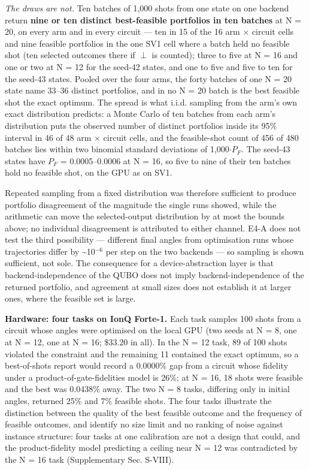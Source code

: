 \documentclass{ieeeaccess}
\begin{document}
\textit{The draws are not.} Ten batches of 1,000 shots from one state on one backend return \textbf{nine or ten distinct best-feasible portfolios in ten batches} at N = 20, on every arm and in every circuit --- ten in 15 of the 16 arm $\times$ circuit cells and nine feasible portfolios in the one SV1 cell where a batch held no feasible shot (ten selected outcomes there if $\perp$ is counted); three to five at N = 16 and one or two at N = 12 for the seed-42 states, and one to five and five to ten for the seed-43 states. Pooled over the four arms, the forty batches of one N = 20 state name 33--36 distinct portfolios, and in no N = 20 batch is the best feasible shot the exact optimum. The spread is what i.i.d. sampling from the arm's own exact distribution predicts: a Monte Carlo of ten batches from each arm's distribution puts the observed number of distinct portfolios inside its 95\% interval in 46 of 48 arm $\times$ circuit cells, and the feasible-shot count of 456 of 480 batches lies within two binomial standard deviations of 1,000$\cdot$$P_{F}$. The seed-43 states have $P_{F}$ = 0.0005--0.0006 at N = 16, so five to nine of their ten batches hold no feasible shot, on the GPU as on SV1.


Repeated sampling from a fixed distribution was therefore sufficient to produce portfolio disagreement of the magnitude the single runs showed, while the arithmetic can move the selected-output distribution by at most the bounds above; no individual disagreement is attributed to either channel. E4-A does not test the third possibility --- different final angles from optimisation runs whose trajectories differ by \~{}10$^{-6}$ per step on the two backends --- so sampling is shown sufficient, not sole. The consequence for a device-abstraction layer is that backend-independence of the QUBO does not imply backend-independence of the returned portfolio, and agreement at small sizes does not establish it at larger ones, where the feasible set is large.


\textbf{Hardware: four tasks on IonQ Forte-1.} Each task samples 100 shots from a circuit whose angles were optimised on the local GPU (two seeds at N = 8, one at N = 12, one at N = 16; \$33.20 in all). In the N = 12 task, 89 of 100 shots violated the constraint and the remaining 11 contained the exact optimum, so a best-of-shots report would record a 0.0000\% gap from a circuit whose fidelity under a product-of-gate-fidelities model is 26\%; at N = 16, 18 shots were feasible and the best was 0.0438\% away. The two N = 8 tasks, differing only in initial angles, returned 25\% and 7\% feasible shots. The four tasks illustrate the distinction between the quality of the best feasible outcome and the frequency of feasible outcomes, and identify no size limit and no ranking of noise against instance structure: four tasks at one calibration are not a design that could, and the product-fidelity model predicting a ceiling near N = 12 was contradicted by the N = 16 task (Supplementary Sec. S-VIII).
\end{document}

